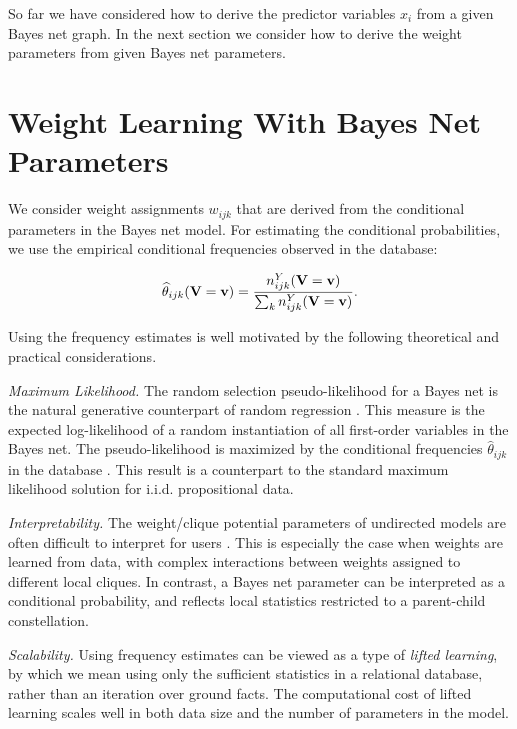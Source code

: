 \documentclass[twoside,leqno,twocolumn]{article}
\begin{document}
So far we have considered how to derive the predictor variables $x_{i}$ from a given Bayes net graph. In the next section we consider how to derive the weight parameters from given Bayes net parameters.



\section{Weight Learning With Bayes Net Parameters}

We consider weight assignments $w_{ijk}$ that are derived from the conditional parameters in the Bayes net model. For estimating the conditional probabilities, we use the empirical conditional frequencies observed in the database:

\begin{equation*} \label{eq:frequencies}
\widehat{\theta}_{ijk}(\mathbf{V} = \mathbf{v}) = \frac{n^{Y}_{ijk}(\mathbf{V} = \mathbf{v})}{\sum_{k}n^{Y}_{ijk}(\mathbf{V} = \mathbf{v})}.
\end{equation*}

Using the frequency estimates is well motivated by the following theoretical and practical considerations. 

\emph{Maximum Likelihood.} The  random selection pseudo-likelihood for a Bayes net is the natural generative counterpart of random regression \cite{Schulte2011}. This measure is the expected log-likelihood of a random instantiation of all first-order variables in the Bayes net. The pseudo-likelihood is maximized by the conditional frequencies $\widehat{\theta}_{ijk}$ in the database \cite[Prop.3.1]{Schulte2011}. This result is a counterpart to the standard maximum likelihood solution for i.i.d. propositional data.

\emph{Interpretability.} The weight/clique potential parameters of undirected models are often difficult to interpret for users \cite{Pearl1988}. 
This is especially the case when weights are learned from data, with complex interactions between weights assigned to different local cliques. In contrast, a Bayes net parameter can be interpreted as a conditional probability, and reflects local statistics restricted to a parent-child constellation.

\emph{Scalability.} 
Using frequency estimates can be viewed as a type of {\em lifted learning}, by which we mean using only the sufficient statistics in a relational database, rather than an iteration over ground facts. The computational cost of lifted learning scales well in both data size and the number of parameters in the model. 
\end{document}
